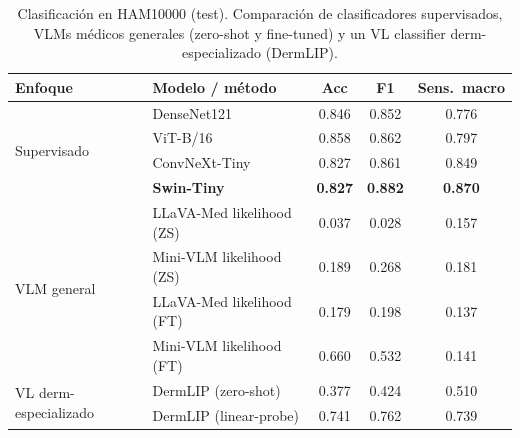 
\begin{table}[htbp]
  \centering
  \caption{Clasificación en HAM10000 (test). Comparación de clasificadores supervisados, VLMs médicos
  generales (zero-shot y fine-tuned) y un VL classifier derm-especializado (DermLIP).}
  \label{tab:clasificacion}
  \begin{tabular}{llccc}
    \toprule
    \textbf{Enfoque} & \textbf{Modelo / método} & \textbf{Acc} & \textbf{F1} & \textbf{Sens.\ macro} \\
    \midrule
    \multirow{4}{*}{Supervisado}
      & DenseNet121      & 0.846 & 0.852 & 0.776 \\
      & ViT-B/16         & 0.858 & 0.862 & 0.797 \\
      & ConvNeXt-Tiny    & 0.827 & 0.861 & 0.849 \\
      & \textbf{Swin-Tiny} & \textbf{0.827} & \textbf{0.882} & \textbf{0.870} \\
    \midrule
    \multirow{4}{*}{VLM general}
      & LLaVA-Med likelihood (ZS)      & 0.037 & 0.028 & 0.157 \\
      & Mini-VLM likelihood (ZS)       & 0.189 & 0.268 & 0.181 \\
      & LLaVA-Med likelihood (FT)      & 0.179 & 0.198 & 0.137 \\
      & Mini-VLM likelihood (FT)       & 0.660 & 0.532 & 0.141 \\
    \midrule
    \multirow{2}{*}{VL derm-especializado}
      & DermLIP (zero-shot)            & 0.377 & 0.424 & 0.510 \\
      & DermLIP (linear-probe)         & 0.741 & 0.762 & 0.739 \\
    \bottomrule
  \end{tabular}
\end{table}

